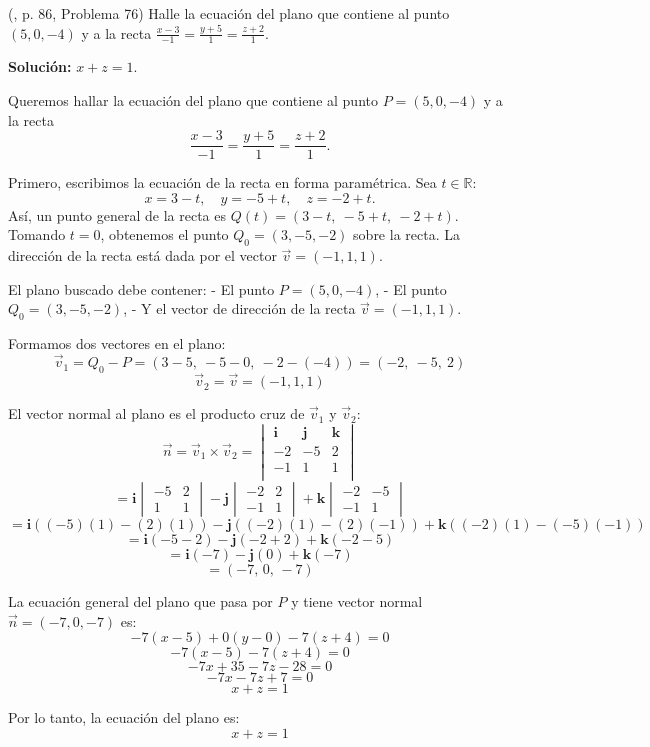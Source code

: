 \begin{prob} (\cite{espinoza2006Algebralineal}, p. 86, Problema 76) Halle la ecuación del plano que contiene al punto $(5,0,-4)$ y a la recta $\frac{x-3}{-1}=\frac{y+5}{1}=\frac{z+2}{1}$. 

\textbf{Solución:} $x+z=1$.

\begin{myproof}
Queremos hallar la ecuación del plano que contiene al punto $P = (5,0,-4)$ y a la recta
\[
\frac{x-3}{-1} = \frac{y+5}{1} = \frac{z+2}{1}.
\]

Primero, escribimos la ecuación de la recta en forma paramétrica. Sea $t \in \mathbb{R}$:
\[
x = 3 - t, \quad y = -5 + t, \quad z = -2 + t.
\]
Así, un punto general de la recta es $Q(t) = (3 - t,\ -5 + t,\ -2 + t)$.  
Tomando $t = 0$, obtenemos el punto $Q_0 = (3, -5, -2)$ sobre la recta.  
La dirección de la recta está dada por el vector $\vec{v} = (-1,1,1)$.

El plano buscado debe contener:
- El punto $P = (5,0,-4)$,
- El punto $Q_0 = (3,-5,-2)$,
- Y el vector de dirección de la recta $\vec{v} = (-1,1,1)$.

Formamos dos vectores en el plano:
\[
\vec{v}_1 = Q_0 - P = (3-5,\ -5-0,\ -2-(-4)) = (-2,\ -5,\ 2)
\]
\[
\vec{v}_2 = \vec{v} = (-1,1,1)
\]

El vector normal al plano es el producto cruz de $\vec{v}_1$ y $\vec{v}_2$:
\[
\vec{n} = \vec{v}_1 \times \vec{v}_2 = 
\begin{vmatrix}
\mathbf{i} & \mathbf{j} & \mathbf{k} \\
-2 & -5 & 2 \\
-1 & 1 & 1 \\
\end{vmatrix}
\]
\[
= \mathbf{i} \begin{vmatrix} -5 & 2 \\ 1 & 1 \end{vmatrix}
- \mathbf{j} \begin{vmatrix} -2 & 2 \\ -1 & 1 \end{vmatrix}
+ \mathbf{k} \begin{vmatrix} -2 & -5 \\ -1 & 1 \end{vmatrix}
\]
\[
= \mathbf{i}((-5)(1) - (2)(1)) - \mathbf{j}((-2)(1) - (2)(-1)) + \mathbf{k}((-2)(1) - (-5)(-1))
\]
\[
= \mathbf{i}(-5 - 2) - \mathbf{j}(-2 + 2) + \mathbf{k}(-2 - 5)
\]
\[
= \mathbf{i}(-7) - \mathbf{j}(0) + \mathbf{k}(-7)
\]
\[
= (-7,\, 0,\, -7)
\]

La ecuación general del plano que pasa por $P$ y tiene vector normal $\vec{n} = (-7,0,-7)$ es:
\[
-7(x - 5) + 0(y - 0) - 7(z + 4) = 0
\]
\[
-7(x - 5) - 7(z + 4) = 0
\]
\[
-7x + 35 - 7z - 28 = 0
\]
\[
-7x - 7z + 7 = 0
\]
\[
x + z = 1
\]

Por lo tanto, la ecuación del plano es:
\[
\boxed{x + z = 1}
\]
\end{myproof}

\end{prob}

